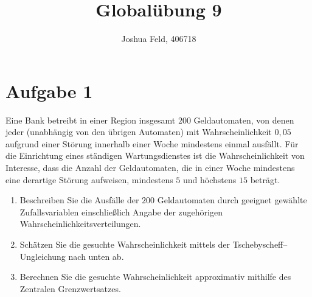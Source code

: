 \documentclass{exercise}
\institute{Institut für Statistik und Wirtschaftsmathematik}
\title{Globalübung 9}
\author{Joshua Feld, 406718}
\begin{document}
    \maketitle


    \section*{Aufgabe 1}
    
    \begin{problem}
        Eine Bank betreibt in einer Region insgesamt \(200\) Geldautomaten, von denen jeder (unabhängig von den übrigen Automaten) mit Wahrscheinlichkeit \(0,05\) aufgrund einer Störung innerhalb einer Woche mindestens einmal ausfällt.
        Für die Einrichtung eines ständigen Wartungsdienstes ist die Wahrscheinlichkeit von Interesse, dass die Anzahl der Geldautomaten, die in einer Woche mindestens eine derartige Störung aufweisen, mindestens \(5\) und höchstens \(15\) beträgt.
        \begin{enumerate}
            \item Beschreiben Sie die Ausfälle der \(200\) Geldautomaten durch geeignet gewählte Zufallsvariablen einschließlich Angabe der zugehörigen Wahrscheinlichkeitsverteilungen.
            \item Schätzen Sie die gesuchte Wahrscheinlichkeit mittels der Tschebyscheff–Ungleichung nach unten ab.
            \item Berechnen Sie die gesuchte Wahrscheinlichkeit approximativ mithilfe des Zentralen Grenzwertsatzes.
        \end{enumerate}
    \end{problem}
    
\end{document}
